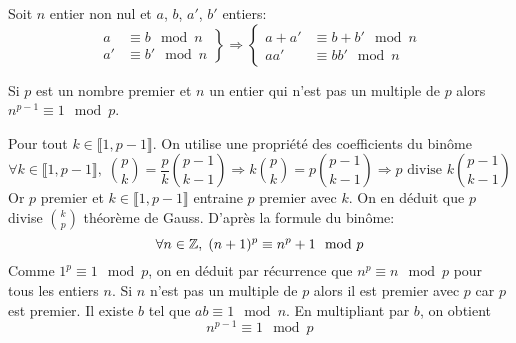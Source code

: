 \begin{prop}
  Soit $n$ entier non nul et $a$, $b$, $a'$, $b'$ entiers:
\begin{displaymath}
  \left. 
  \begin{aligned}
    a &\equiv b \mod n \\ a' &\equiv b' \mod n
  \end{aligned}
\right\rbrace \Rightarrow
\left\lbrace 
  \begin{aligned}
    a + a' &\equiv b + b' \mod n \\ a  a' &\equiv b b' \mod n
  \end{aligned}
\right. 
\end{displaymath}
\end{prop}
\begin{prop}
  Si $p$ est un nombre premier et $n$ un entier qui n'est pas un multiple de $p$ alors $n^{p-1} \equiv 1 \mod p$.
\end{prop}
\begin{demo}
  Pour tout $k\in \llbracket 1, p-1 \rrbracket$. On utilise une propriété des coefficients du binôme
\begin{displaymath}
  \forall k\in \llbracket 1, p-1 \rrbracket,\;
\binom{p}{k} = \frac{p}{k} \binom{p-1}{k-1} \Rightarrow k\binom{p}{k} = p \binom{p-1}{k-1} \Rightarrow p \text{ divise } k \binom{p-1}{k-1}
\end{displaymath}
Or $p$ premier et $k\in \llbracket 1, p-1 \rrbracket$ entraine $p$ premier avec $k$. On en déduit que $p$ divise $\binom{k}{p}$  théorème de Gauss.\newline
D'après la formule du binôme:
\begin{displaymath}
  \forall n \in\mathbb{Z}, \; (n+1)^p \equiv n^p + 1 \mod p
\end{displaymath}
Comme $1^p \equiv 1 \mod p$, on en déduit par récurrence que $n^p \equiv n \mod p$ pour tous les entiers $n$. Si $n$ n'est pas un multiple de $p$ alors il est premier avec $p$ car $p$ est premier. Il existe $b$ tel que $ab \equiv 1 \mod n$. En multipliant par $b$, on obtient
\begin{displaymath}
  n^{p-1} \equiv 1 \mod p
\end{displaymath}
\end{demo}

